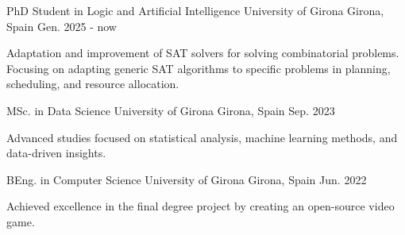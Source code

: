 

\begin{cventries}

  \cventry
    {PhD Student in Logic and Artificial Intelligence} %
    {University of Girona} %
    {Girona, Spain} %
    {Gen. 2025 - now} %
    {
      \begin{cvitems} %
      \item {Adaptation and improvement of SAT solvers for solving
        combinatorial problems. Focusing on adapting generic SAT algorithms
    to specific problems in planning, scheduling, and resource allocation.}
      \end{cvitems}
    }
  \cventry
    {MSc. in Data Science} %
    {University of Girona} %
    {Girona, Spain} %
    {Sep. 2023} %
    {
      \begin{cvitems} %
      \item {Advanced studies focused on statistical analysis, machine learning methods, and data-driven insights.}
      \end{cvitems}
    }

    \cventry
    {BEng. in Computer Science} %
    {University of Girona} %
    {Girona, Spain} %
    {Jun. 2022} %
    {
      \begin{cvitems} %
        \item {Achieved excellence in the final degree project by creating an open-source video game.}
      \end{cvitems}
    }

\end{cventries}
